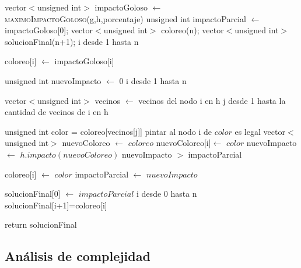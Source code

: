\begin{algorithm}[H]
\caption{} 
\begin{codebox}

\li
\li vector$<$unsigned int$>$ impactoGoloso  $\gets$ \textsc{maximoImpactoGoloso}(g,h,porcentaje)
\li unsigned int impactoParcial $\gets$ impactoGoloso[0];
\li vector$<$unsigned int$>$ coloreo(n);
\li
\li vector$<$unsigned int$>$ solucionFinal(n+1);
\li
\li \For i desde 1 hasta n \Do
    
\li 	coloreo[i] $\gets$ impactoGoloso[i]
    
    \End
\li

\li unsigned int nuevoImpacto $\gets$ 0
\li
\li	\For i desde 1 hasta n \Do
	
\li
\li		vector$<$unsigned int$>$ vecinos $\gets$ vecinos del nodo i en h
\li
\li 	\For j desde 1 hasta la cantidad de vecinos de i en h \Do

\li				unsigned int color = coloreo[vecinos[j]]
\li
\li				\If pintar al nodo i de $color$ es legal \Do			
\li						vector$<$unsigned int$>$ nuevoColoreo $\gets$ \quad $coloreo$
\li						nuevoColoreo[i]$ \gets$ \quad $color$
\li                		nuevoImpacto $ \gets$ \quad $h.impacto(nuevoColoreo)$
\li
\li                		\If nuevoImpacto $>$ impactoParcial \Do
                
\li                			coloreo[i] $\gets$ \quad $color$
\li                   			impactoParcial $\gets$ \quad $nuevoImpacto$
                   		\End
\li
                \End
        \End
    \End

\li
\li 		solucionFinal[0] $\gets$ \quad $impactoParcial$
\li
\li \For i desde 0 hasta n \Do
\li		solucionFinal[i+1]=coloreo[i]
	\End    

\li
\li return solucionFinal
\End
\end{codebox}
\end{algorithm}

\subsection{Análisis de complejidad}

